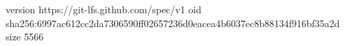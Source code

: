version https://git-lfs.github.com/spec/v1
oid sha256:6997ac612cc2da7306590ff02657236d0eacea4b6037ec8b88134f916bf35a2d
size 5566
